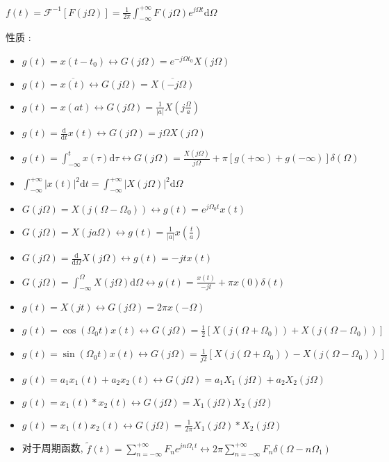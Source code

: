 \documentclass[UTF8, 12pt]{ctexart}
\begin{document}
		$ f(t) = \mathscr{F}^{-1}[F(j\Omega)] = \frac{1}{2\pi}\int_{-\infty}^{+\infty}F(j\Omega)e^{j\Omega t}\mathrm{d}\Omega $

		性质 : 
		\begin{itemize}[leftmargin = 4em]
			\item $ g(t) = x(t-t_{0}) \leftrightarrow G(j\Omega) = e^{-j\Omega t_{0}}X(j\Omega) $
			\item $ g(t) = \overline{x(t)} \leftrightarrow G(j\Omega) = \overline{X(-j\Omega)} $
			\item $ g(t) = x(at) \leftrightarrow G(j\Omega) = \frac{1}{|a|}X(j\frac{\Omega}{a}) $
			\item $ g(t) = \frac{\mathrm{d}}{\mathrm{d}t}x(t) \leftrightarrow G(j\Omega) = j\Omega X(j\Omega) $
			\item $ g(t) = \int_{-\infty}^{t}x(\tau)\mathrm{d}\tau \leftrightarrow G(j\Omega) = \frac{X(j\Omega)}{j\Omega} + \pi [g(+\infty)+g(-\infty)]\delta(\Omega) $
			\item $ \int_{-\infty}^{+\infty}|x(t)|^{2}\mathrm{d}t = \int_{-\infty}^{+\infty}|X(j\Omega)|^{2}\mathrm{d}\Omega $
			\item $ G(j\Omega) = X(j(\Omega-\Omega_{0})) \leftrightarrow g(t) = e^{j\Omega_{0}t}x(t) $
			\item $ G(j\Omega) = X(ja\Omega) \leftrightarrow g(t) = \frac{1}{|a|}x(\frac{t}{a}) $
			\item $ G(j\Omega) = \frac{\mathrm{d}}{\mathrm{d}\Omega}X(j\Omega) \leftrightarrow g(t) = -jtx(t) $
			\item $ G(j\Omega) = \int_{-\infty}^{\Omega}X(j\Omega)\mathrm{d}\Omega \leftrightarrow g(t) = \frac{x(t)}{-jt} + \pi x(0)\delta(t) $
			\item $ g(t) = X(jt) \leftrightarrow G(j\Omega) = 2\pi x(-\Omega) $ 
			\item $ g(t) = \cos(\Omega_{0}t)x(t) \leftrightarrow G(j\Omega) = \frac{1}{2}[X(j(\Omega+\Omega_{0}))+X(j(\Omega-\Omega_{0}))] $
			\item $ g(t) = \sin(\Omega_{0}t)x(t) \leftrightarrow G(j\Omega) = \frac{1}{j2}[X(j(\Omega+\Omega_{0}))-X(j(\Omega-\Omega_{0}))] $
			\item $ g(t) = a_{1}x_{1}(t)+a_{2}x_{2}(t) \leftrightarrow G(j\Omega) = a_{1}X_{1}(j\Omega)+a_{2}X_{2}(j\Omega) $
			\item $ g(t) = x_{1}(t)*x_{2}(t) \leftrightarrow G(j\Omega) = X_{1}(j\Omega)X_{2}(j\Omega) $
			\item $ g(t) = x_{1}(t)x_{2}(t) \leftrightarrow G(j\Omega) = \frac{1}{2\pi}X_{1}(j\Omega)*X_{2}(j\Omega) $
			\item 对于周期函数, $ \tilde{f}(t) = \sum\limits_{n=-\infty}^{+\infty}F_{n}e^{jn\Omega_{1}t} \leftrightarrow 2\pi\sum\limits_{n=-\infty}^{+\infty}F_{n}\delta(\Omega-n\Omega_{1}) $
		\end{itemize}
		
\end{document}

